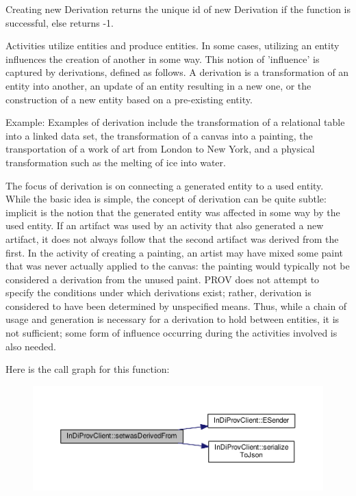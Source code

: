 Creating new Derivation returns the unique id of new Derivation if the function is successful, else returns -\/1. 

Activities utilize entities and produce entities. In some cases, utilizing an entity influences the creation of another in some way. This notion of 'influence' is captured by derivations, defined as follows. A derivation is a transformation of an entity into another, an update of an entity resulting in a new one, or the construction of a new entity based on a pre-\/existing entity.\par
 Example\-: Examples of derivation include the transformation of a relational table into a linked data set, the transformation of a canvas into a painting, the transportation of a work of art from London to New York, and a physical transformation such as the melting of ice into water.\par
 The focus of derivation is on connecting a generated entity to a used entity. While the basic idea is simple, the concept of derivation can be quite subtle\-: implicit is the notion that the generated entity was affected in some way by the used entity. If an artifact was used by an activity that also generated a new artifact, it does not always follow that the second artifact was derived from the first. In the activity of creating a painting, an artist may have mixed some paint that was never actually applied to the canvas\-: the painting would typically not be considered a derivation from the unused paint. P\-R\-O\-V does not attempt to specify the conditions under which derivations exist; rather, derivation is considered to have been determined by unspecified means. Thus, while a chain of usage and generation is necessary for a derivation to hold between entities, it is not sufficient; some form of influence occurring during the activities involved is also needed. 

Here is the call graph for this function\-:
\nopagebreak
\begin{figure}[H]
\begin{center}
\leavevmode
\includegraphics[width=350pt]{class_in_di_prov_client_afc085d595289e66d9b3928e9a4229051_cgraph}
\end{center}
\end{figure}




